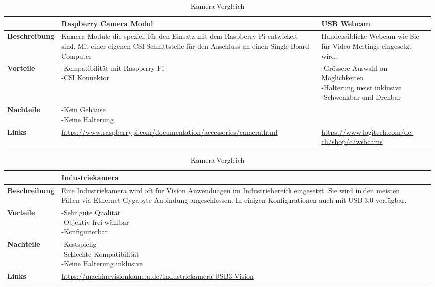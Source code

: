 \begin{table}[H]
\centering
\small
\begin{tabularx}{\textwidth}{|l|X|X|}
\hline
\textbf{} & \textbf{Raspberry Camera Modul} & \textbf{USB Webcam}\\
  \hline
  \textbf{Beschreibung} & Kamera Module die speziell für den Einsatz mit dem Raspberry Pi entwickelt sind. Mit einer eigenen CSI Schnittstelle für den Anschluss an einen Single Board Computer & Handelsübliche Webcam wie Sie für Video Meetings eingesetzt wird. \\
  \hline
  \textbf{Vorteile}  & \makecell{-Kompatibilität mit Raspberry Pi \\ -CSI Konnektor} & \makecell{-Grössere Auswahl an Möglichkeiten \\ -Halterung meist inklusive \\ -Schwenkbar und Drehbar} \\
  \hline
  \textbf{Nachteile} & \makecell{-Kein Gehäuse \\ -Keine Halterung} & \makecell{} \\
  \hline
  \textbf{Links} & \url{https://www.raspberrypi.com/documentation/accessories/camera.html} & \url{https://www.logitech.com/de-ch/shop/c/webcams} \\
  \hline
\end{tabularx}
\begin{tabularx}{\textwidth}{|l|X|X|}
\hline
\textbf{} & \textbf{Industriekamera} & \textbf{} \\
  \hline
  \textbf{Beschreibung} & Eine Industriekamera wird oft für Vision Anwendungen im Industriebereich eingesetzt. Sie wird in den meisten Fällen via Ethernet Gygabyte Anbindung angeschlossen. In einigen Konfigurationen auch mit USB 3.0 verfügbar. & \\
  \hline
  \textbf{Vorteile}  & \makecell{-Sehr gute Qualität \\ -Objektiv frei wählbar \\ -Konfigurierbar} & \makecell{} \\
  \hline
  \textbf{Nachteile} & \makecell{-Kostspielig \\ -Schlechte Kompatibilität \\ -Keine Halterung inklusive} & \makecell{} \\
  \hline
  \textbf{Links} & \url{https://machinevisionkamera.de/Industriekamera-USB3-Vision} & \\
  \hline
\end{tabularx}
\caption{Kamera Vergleich}
\label{table:camera-compare}
\end{table}



